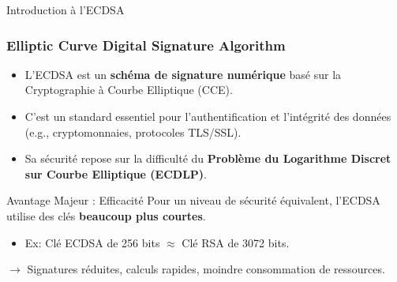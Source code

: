 
\begin{frame}{Introduction à l'ECDSA}
\frametitle{Elliptic Curve Digital Signature Algorithm}

\begin{itemize}
    \item L'ECDSA est un \textbf{schéma de signature numérique} basé sur la Cryptographie à Courbe Elliptique (CCE).
    \item C'est un standard essentiel pour l'authentification et l'intégrité des données (e.g., cryptomonnaies, protocoles TLS/SSL).
    \item Sa sécurité repose sur la difficulté du \textbf{Problème du Logarithme Discret sur Courbe Elliptique (ECDLP)}.
\end{itemize}

\begin{block}{Avantage Majeur : Efficacité}
    Pour un niveau de sécurité équivalent, l'ECDSA utilise des clés \textbf{beaucoup plus courtes}.
    \begin{itemize}
        \item Ex: Clé ECDSA de 256 bits $\approx$ Clé RSA de 3072 bits.
    \end{itemize}
    $\rightarrow$ Signatures réduites, calculs rapides, moindre consommation de ressources.
\end{block}
\end{frame}

